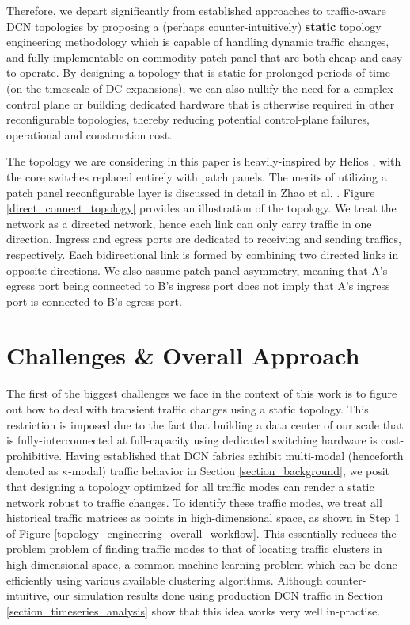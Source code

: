\documentclass[sigconf]{acmart}
\theoremstyle{definition}
\begin{document}
Therefore, we depart significantly from established approaches to traffic-aware DCN topologies by proposing a (perhaps counter-intuitively) \textbf{static} topology engineering methodology which is capable of handling dynamic traffic changes, and fully implementable on commodity patch panel that are both cheap and easy to operate. By designing a topology that is static for prolonged periods of time (on the timescale of DC-expansions), we can also nullify the need for a complex control plane or building dedicated hardware that is otherwise required in other reconfigurable topologies, thereby reducing potential control-plane failures, operational and construction cost. 

The topology we are considering in this paper is heavily-inspired by Helios \cite{farrington2011helios}, with the core switches replaced entirely with patch panels. The merits of utilizing a patch panel reconfigurable layer is discussed in detail in Zhao et al. \cite{zhao2018minimal}. Figure \ref{direct_connect_topology} provides an illustration of the topology. We treat the network as a directed network, hence each link can only carry traffic in one direction. Ingress and egress ports are dedicated to receiving and sending traffics, respectively. Each bidirectional link is formed by combining two directed links in opposite directions. We also assume patch panel-asymmetry, meaning that A's egress port being connected to B's ingress port does not imply that A's ingress port is connected to B's egress port.

\section{Challenges \& Overall Approach}\label{section_challenges_overall_approach}

The first of the biggest challenges we face in the context of this work is to figure out how to deal with transient traffic changes using a static topology. This restriction is imposed due to the fact that building a data center of our scale that is fully-interconnected at full-capacity using dedicated switching hardware is cost-prohibitive. Having established that DCN fabrics exhibit multi-modal (henceforth denoted as $\kappa$-modal) traffic behavior in Section \ref{section_background}, we posit that designing a topology optimized for all traffic modes can render a static network robust to traffic changes. To identify these traffic modes, we treat all historical traffic matrices as points in high-dimensional space, as shown in Step 1 of Figure \ref{topology_engineering_overall_workflow}. This essentially reduces the problem problem of finding traffic modes to that of locating traffic clusters in high-dimensional space, a common machine learning problem which can be done efficiently using various available clustering algorithms. Although counter-intuitive, our simulation results done using production DCN traffic in Section \ref{section_timeseries_analysis} show that this idea works very well in-practise.
\end{document}
